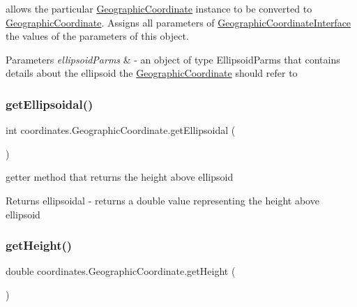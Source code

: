 allows the particular \hyperlink{classcoordinates_1_1_geographic_coordinate}{Geographic\+Coordinate} instance to be converted to \hyperlink{classcoordinates_1_1_geographic_coordinate}{Geographic\+Coordinate}. Assigns all parameters of \hyperlink{classcoordinates_1_1_geographic_coordinate_interface}{Geographic\+Coordinate\+Interface} the values of the parameters of this object. 


\begin{DoxyParams}{Parameters}
{\em ellipsoid\+Parms} & -\/ an object of type Ellipsoid\+Parms that contains details about the ellipsoid the \hyperlink{classcoordinates_1_1_geographic_coordinate}{Geographic\+Coordinate} should refer to \\
\hline
\end{DoxyParams}
\mbox{\label{classcoordinates_1_1_geographic_coordinate_a1e330f3f407a29251d66204401e80e85}} 
\subsubsection{\texorpdfstring{get\+Ellipsoidal()}{getEllipsoidal()}}
{\footnotesize\ttfamily int coordinates.\+Geographic\+Coordinate.\+get\+Ellipsoidal (\begin{DoxyParamCaption}{ }\end{DoxyParamCaption})}



getter method that returns the height above ellipsoid 

\begin{DoxyReturn}{Returns}
ellipsoidal -\/ returns a double value representing the height above ellipsoid 
\end{DoxyReturn}
\mbox{\label{classcoordinates_1_1_geographic_coordinate_aea53916d3d136bf18262dc096c468104}} 
\subsubsection{\texorpdfstring{get\+Height()}{getHeight()}}
{\footnotesize\ttfamily double coordinates.\+Geographic\+Coordinate.\+get\+Height (\begin{DoxyParamCaption}{ }\end{DoxyParamCaption})}



